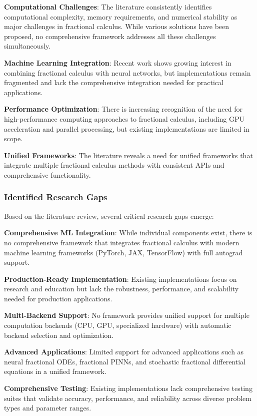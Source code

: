 \textbf{Computational Challenges}: The literature consistently identifies computational complexity, memory requirements, and numerical stability as major challenges in fractional calculus. While various solutions have been proposed, no comprehensive framework addresses all these challenges simultaneously.

\textbf{Machine Learning Integration}: Recent work shows growing interest in combining fractional calculus with neural networks, but implementations remain fragmented and lack the comprehensive integration needed for practical applications.

\textbf{Performance Optimization}: There is increasing recognition of the need for high-performance computing approaches to fractional calculus, including GPU acceleration and parallel processing, but existing implementations are limited in scope.

\textbf{Unified Frameworks}: The literature reveals a need for unified frameworks that integrate multiple fractional calculus methods with consistent APIs and comprehensive functionality.

\subsubsection{Identified Research Gaps}

Based on the literature review, several critical research gaps emerge:

\textbf{Comprehensive ML Integration}: While individual components exist, there is no comprehensive framework that integrates fractional calculus with modern machine learning frameworks (PyTorch, JAX, TensorFlow) with full autograd support.

\textbf{Production-Ready Implementation}: Existing implementations focus on research and education but lack the robustness, performance, and scalability needed for production applications.

\textbf{Multi-Backend Support}: No framework provides unified support for multiple computation backends (CPU, GPU, specialized hardware) with automatic backend selection and optimization.

\textbf{Advanced Applications}: Limited support for advanced applications such as neural fractional ODEs, fractional PINNs, and stochastic fractional differential equations in a unified framework.

\textbf{Comprehensive Testing}: Existing implementations lack comprehensive testing suites that validate accuracy, performance, and reliability across diverse problem types and parameter ranges.

